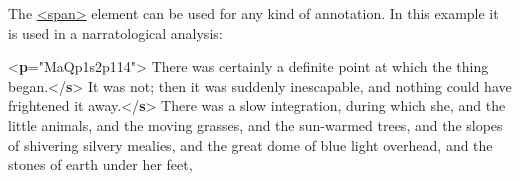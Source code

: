 The \hyperref[TEI.span]{<span>} element can be used for any kind of annotation. In this example it is used in a narratological analysis: \par\bgroup{}\exampleFont \begin{shaded}\noindent\mbox{}{<\textbf{p}\hspace*{1em}{xml:id}="{MaQp1s2p114}">}\mbox{}\newline 
{}There was certainly a definite point at which the\mbox{}\newline 
\hspace*{1em}\hspace*{1em} thing began.{</\textbf{s}>}\mbox{}\newline 
{}It was not; then it was suddenly inescapable,\mbox{}\newline 
\hspace*{1em}\hspace*{1em} and nothing could have frightened it away.{</\textbf{s}>}\mbox{}\newline 
{}There was a slow integration, during which she,\mbox{}\newline 
\hspace*{1em}\hspace*{1em} and the little animals, and the moving grasses, and the sun-warmed\mbox{}\newline 
\hspace*{1em}\hspace*{1em} trees, and the slopes of shivering silvery mealies, and the great\mbox{}\newline 
\hspace*{1em}\hspace*{1em} dome of blue light overhead, and the stones of earth under her feet,\mbox{}\newline 

\end{shaded}
